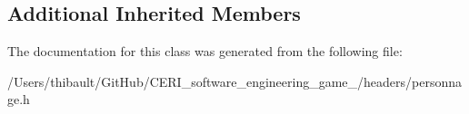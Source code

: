 \subsection*{Additional Inherited Members}


The documentation for this class was generated from the following file\+:\begin{DoxyCompactItemize}
\item 
/\+Users/thibault/\+Git\+Hub/\+C\+E\+R\+I\+\_\+software\+\_\+engineering\+\_\+game\+\_/headers/personnage.\+h\end{DoxyCompactItemize}
